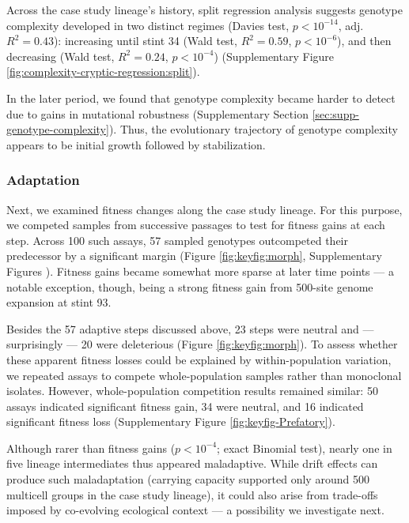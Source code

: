 Across the case study lineage's history, split regression analysis suggests genotype complexity developed in two distinct regimes (Davies test, $p < 10^{-14}$, adj. $R^2=0.43$): increasing until stint 34 (Wald test, $R^2 = 0.59$, $p < 10^{-6}$), and then decreasing (Wald test, $R^2 = 0.24$, $p < 10^{-4}$) (Supplementary Figure \ref{fig:complexity-cryptic-regression:split}).

In the later period, we found that genotype complexity became harder to detect due to gains in mutational robustness (Supplementary Section \ref{sec:supp-genotype-complexity}).
Thus, the evolutionary trajectory of genotype complexity appears to be initial growth followed by stabilization.

\subsubsection{Adaptation}

Next, we examined fitness changes along the case study lineage.
For this purpose, we competed samples from successive passages to test for fitness gains at each step.
Across 100 such assays, 57 sampled genotypes outcompeted their predecessor by a significant margin (Figure \ref{fig:keyfig:morph}, Supplementary Figures ).
Fitness gains became somewhat more sparse at later time points --- a notable exception, though, being a strong fitness gain from 500-site genome expansion at stint 93.

Besides the 57 adaptive steps discussed above, 23 steps were neutral and --- surprisingly --- 20 were deleterious (Figure \ref{fig:keyfig:morph}).
To assess whether these apparent fitness losses could be explained by within-population variation, we repeated assays to compete whole-population samples rather than monoclonal isolates.
However, whole-population competition results remained similar: 50 assays indicated significant fitness gain, 34 were neutral, and 16 indicated significant fitness loss (Supplementary Figure \ref{fig:keyfig-Prefatory}).

Although rarer than fitness gains ($p < 10^{-4}$; exact Binomial test), nearly one in five lineage intermediates thus appeared maladaptive.
While drift effects can produce such maladaptation (carrying capacity supported only around 500 multicell groups in the case study lineage), it could also arise from trade-offs imposed by co-evolving ecological context \citep{brady2019causes} --- a possibility we investigate next.

